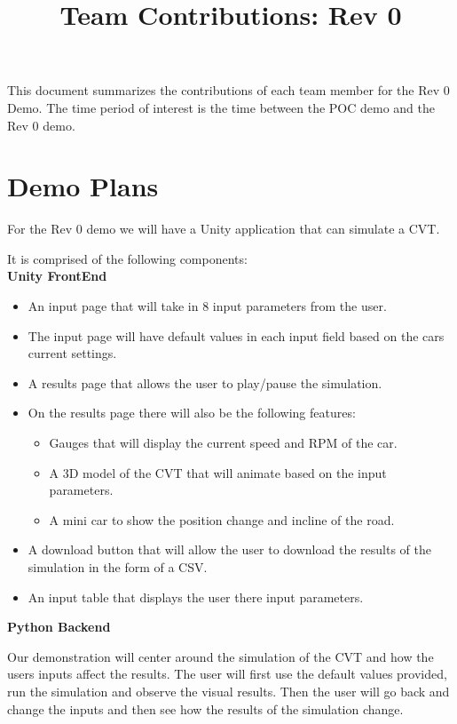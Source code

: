 \documentclass{article}
\title{Team Contributions: Rev 0\\\progname}
\author{\authname}
\date{}
\begin{document}
\maketitle

This document summarizes the contributions of each team member for the Rev 0
Demo.  The time period of interest is the time between the POC demo and the Rev
0 demo.

\section{Demo Plans}


For the Rev 0 demo we will have a Unity application that can simulate a CVT.

It is comprised of the following components:\\

\textbf{Unity FrontEnd}

\begin{itemize}
  \item An input page that will take in 8 input parameters from the user.
  \item The input page will have default values in each input field based on the cars current settings.
  \item A results page that allows the user to play/pause the simulation.
  \item On the results page there will also be the following features:
  \begin{itemize}
    \item Gauges that will display the current speed and RPM of the car.
    \item A 3D model of the CVT that will animate based on the input parameters.
    \item A mini car to show the position change and incline of the road.
  \end{itemize}
  \item A download button that will allow the user to download the results of the simulation in the form of a CSV.
  \item An input table that displays the user there input parameters.
\end{itemize}

\textbf{Python Backend}

Our demonstration will center around the simulation of the CVT and how the users inputs affect the results.
The user will first use the default values provided, run the simulation and observe the visual results.
Then the user will go back and change the inputs and then see how the results of the simulation change. 
\end{document}
